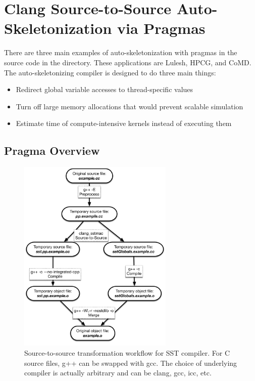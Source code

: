 
\chapter{Clang Source-to-Source Auto-Skeletonization via Pragmas}
\label{clangTutorial}

There are three main examples of auto-skeletonization with pragmas in the \sstmacro source code in the  directory.
These applications are Lulesh, HPCG, and CoMD.
The auto-skeletonizing compiler is designed to do three main things:

\begin{itemize}
\item Redirect global variable accesses to thread-specific values
\item Turn off large memory allocations that would prevent scalable simulation
\item Estimate time of compute-intensive kernels instead of executing them
\end{itemize}

\section{Pragma Overview}

\begin{figure}[h!]
\centering
\includegraphics[width=0.66\textwidth]{figures/compilerWorkflow}
\caption{Source-to-source transformation workflow for SST compiler. For C source files, g++ can be swapped with gcc. The choice of underlying compiler is actually arbitrary and can be clang, gcc, icc, etc.}
\label{fig:compilerWorkflow}
\end{figure}

